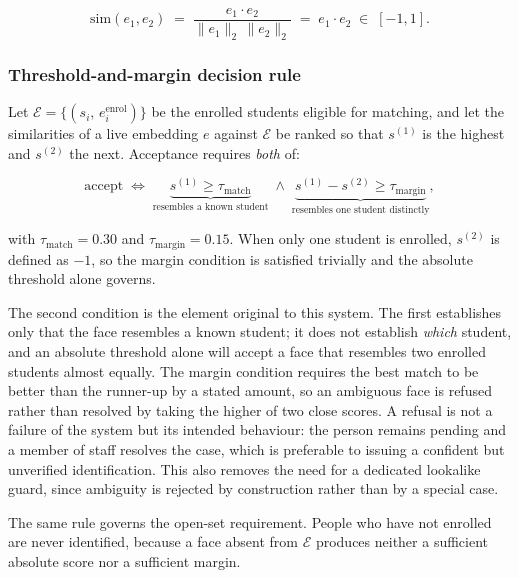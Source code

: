 \begin{equation}
\mathrm{sim}(e_1, e_2) \;=\;
\frac{e_1 \cdot e_2}{\lVert e_1 \rVert_2 \, \lVert e_2 \rVert_2}
\;=\; e_1 \cdot e_2 \;\in\; [-1, 1].
\label{eq:cosine}
\end{equation}

\subsubsection{Threshold-and-margin decision rule}
\label{subsubsec:hybrid}

Let $\mathcal{E} = \{(s_i,\, e_i^{\mathrm{enrol}})\}$ be the enrolled
students eligible for matching, and let the similarities of a live
embedding $e$ against $\mathcal{E}$ be ranked so that $s^{(1)}$ is the
highest and $s^{(2)}$ the next. Acceptance requires \emph{both} of:

\begin{equation}
\text{accept} \;\Longleftrightarrow\;
\underbrace{s^{(1)} \geq \tau_{\mathrm{match}}}_{\text{resembles a known student}}
\;\wedge\;
\underbrace{s^{(1)} - s^{(2)} \geq \tau_{\mathrm{margin}}}_{\text{resembles one student distinctly}},
\label{eq:face-decision}
\end{equation}

\noindent with $\tau_{\mathrm{match}} = 0.30$ and
$\tau_{\mathrm{margin}} = 0.15$. When only one student is enrolled,
$s^{(2)}$ is defined as $-1$, so the margin condition is satisfied
trivially and the absolute threshold alone governs.

The second condition is the element original to this system. The first
establishes only that the face resembles a known student; it does not
establish \emph{which} student, and an absolute threshold alone will
accept a face that resembles two enrolled students almost equally. The
margin condition requires the best match to be better than the runner-up
by a stated amount, so an ambiguous face is refused rather than resolved
by taking the higher of two close scores. A refusal is not a failure of
the system but its intended behaviour: the person remains pending and a
member of staff resolves the case, which is preferable to issuing a
confident but unverified identification. This also removes the need for a
dedicated lookalike guard, since ambiguity is rejected by construction
rather than by a special case.

The same rule governs the open-set requirement. People who have not
enrolled are never identified, because a face absent from $\mathcal{E}$
produces neither a sufficient absolute score nor a sufficient margin.

